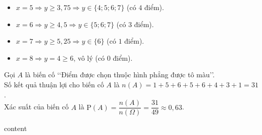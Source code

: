 \begin{ex}
{\begin{itemize}
			\item $x=5 \Rightarrow y \ge 3{,}75 \Rightarrow y \in \{4;5;6;7\}$ (có $4$ điểm).
			\item $x=6 \Rightarrow y \ge 4{,}5 \Rightarrow y \in \{5;6;7\}$ (có $3$ điểm).
			\item $x=7 \Rightarrow y \ge 5{,}25 \Rightarrow y \in \{6\}$ (có $1$ điểm).
			\item $x=8 \Rightarrow y=4 \ge 6$, vô lý (có $0$ điểm).
		\end{itemize}
		Gọi $A$ là biến cố \lq\lq Điểm được chọn thuộc hình phẳng được tô màu\rq\rq. \\
		Số kết quả thuận lợi cho biến cố $A$ là $n(A) = 1 + 5 + 6 + 5 + 6 + 4 + 3 + 1 = 31$.\\
		Xác suất của biến cố $A$ là $\mathrm{P}(A) = \dfrac{n(A)}{n(\Omega)} = \dfrac{31}{49} \approx 0{,}63$.
	}
\end{ex}
\begin{environment-name}
	content
\end{environment-name}
